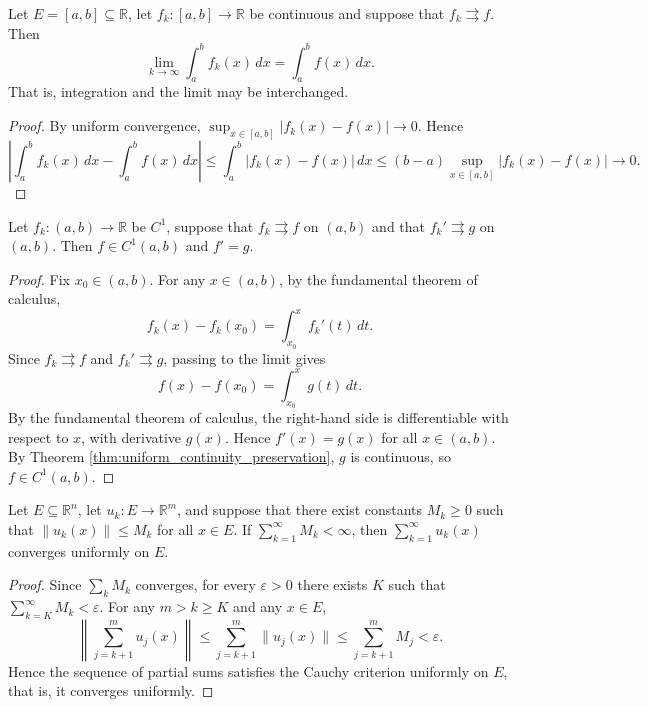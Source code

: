 \begin{theorem}\label{thm:uniform_continuity_integral}
Let $E = [a, b] \subseteq \mathbb{R}$, let $f_k: [a, b] \to \mathbb{R}$ be continuous and suppose that $f_k \rightrightarrows f$. Then
\[
\lim_{k \to \infty} \int_a^b f_k(x) \, dx = \int_a^b f(x) \, dx.
\]
That is, integration and the limit may be interchanged.
\end{theorem}

\begin{proof}
By uniform convergence, $\sup_{x \in [a, b]} |f_k(x) - f(x)| \to 0$. Hence
\[
\left| \int_a^b f_k(x) \, dx - \int_a^b f(x) \, dx \right| \le \int_a^b |f_k(x) - f(x)| \, dx \le (b - a) \sup_{x \in [a, b]} |f_k(x) - f(x)| \to 0.
\]
\end{proof}

\begin{theorem}\label{thm:uniform_continuity_derivative}
Let $f_k: (a, b) \to \mathbb{R}$ be $C^1$, suppose that $f_k \rightrightarrows f$ on $(a, b)$ and that $f_k' \rightrightarrows g$ on $(a, b)$. Then $f \in C^1(a, b)$ and $f' = g$.
\end{theorem}

\begin{proof}
Fix $x_0 \in (a, b)$. For any $x \in (a, b)$, by the fundamental theorem of calculus,
\[
f_k(x) - f_k(x_0) = \int_{x_0}^{x} f_k'(t) \, dt.
\]
Since $f_k \rightrightarrows f$ and $f_k' \rightrightarrows g$, passing to the limit gives
\[
f(x) - f(x_0) = \int_{x_0}^{x} g(t) \, dt.
\]
By the fundamental theorem of calculus, the right-hand side is differentiable with respect to $x$, with derivative $g(x)$. Hence $f'(x) = g(x)$ for all $x \in (a, b)$. By Theorem \ref{thm:uniform_continuity_preservation}, $g$ is continuous, so $f \in C^1(a, b)$.
\end{proof}

\begin{theorem}\label{thm:weierstrass_m_test_ra}
Let $E \subseteq \mathbb{R}^n$, let $u_k: E \to \mathbb{R}^m$, and suppose that there exist constants $M_k \ge 0$ such that $\|u_k(x)\| \le M_k$ for all $x \in E$. If $\sum_{k=1}^{\infty} M_k < \infty$, then $\sum_{k=1}^{\infty} u_k(x)$ converges uniformly on $E$.
\end{theorem}

\begin{proof}
Since $\sum_k M_k$ converges, for every $\varepsilon > 0$ there exists $K$ such that $\sum_{k=K}^{\infty} M_k < \varepsilon$. For any $m > k \ge K$ and any $x \in E$,
\[
\left\| \sum_{j=k+1}^{m} u_j(x) \right\| \le \sum_{j=k+1}^{m} \|u_j(x)\| \le \sum_{j=k+1}^{m} M_j < \varepsilon.
\]
Hence the sequence of partial sums satisfies the Cauchy criterion uniformly on $E$, that is, it converges uniformly.
\end{proof}

